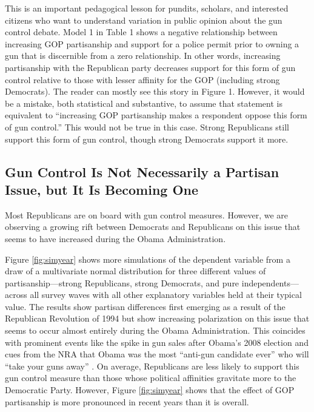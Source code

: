 \documentclass[11pt,]{article}
\begin{document}
This is an important pedagogical lesson for pundits, scholars, and
interested citizens who want to understand variation in public opinion
about the gun control debate. Model 1 in Table 1 shows a negative
relationship between increasing GOP partisanship and support for a
police permit prior to owning a gun that is discernible from a zero
relationship. In other words, increasing partisanship with the
Republican party decreases support for this form of gun control relative
to those with lesser affinity for the GOP (including strong Democrats).
The reader can mostly see this story in Figure 1. However, it would be a
mistake, both statistical and substantive, to assume that statement is
equivalent to ``increasing GOP partisanship makes a respondent oppose
this form of gun control.'' This would not be true in this case. Strong
Republicans still support this form of gun control, though strong
Democrats support it more.

\subsection{Gun Control Is Not Necessarily a Partisan Issue, but It Is
Becoming
One}\label{gun-control-is-not-necessarily-a-partisan-issue-but-it-is-becoming-one}

Most Republicans are on board with gun control measures. However, we are
observing a growing rift between Democrats and Republicans on this issue
that seems to have increased during the Obama Administration.

Figure \ref{fig:simyear} shows more simulations of the dependent
variable from a draw of a multivariate normal distribution for three
different values of partisanship---strong Republicans, strong Democrats,
and pure independents---across all survey waves with all other
explanatory variables held at their typical value. The results show
partisan differences first emerging as a result of the Republican
Revolution of 1994 but show increasing polarization on this issue that
seems to occur almost entirely during the Obama Administration. This
coincides with prominent events like the spike in gun sales after
Obama's 2008 election \citep{bohn2008gss} and cues from the NRA that
Obama was the most ``anti-gun candidate ever'' who will ``take your guns
away'' \citep{smith2008nra}. On average, Republicans are less likely to
support this gun control measure than those whose political affinities
gravitate more to the Democratic Party. However, Figure
\ref{fig:simyear} shows that the effect of GOP partisanship is more
pronounced in recent years than it is overall.
\end{document}
